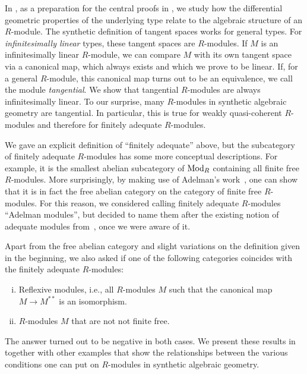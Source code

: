 In , as a preparation for the central proofs in , we study how the differential geometric properties of the underlying type relate to the algebraic structure of an $R$-module.
The synthetic definition of tangent spaces works for general types. For \emph{infinitesimally linear} types, these tangent spaces are $R$-modules. If $M$ is an infinitesimally linear $R$-module, we can compare $M$ with its own tangent space via a canonical map, which always exists and which we prove to be linear. If, for a general $R$-module, this canonical map turns out to be an equivalence, we call the module \emph{tangential}. We show that tangential $R$-modules are always infinitesimally linear.
To our surprise, many $R$-modules in synthetic algebraic geometry are tangential.  In particular, this is true for weakly quasi-coherent $R$-modules and therefore for finitely adequate $R$-modules.

We gave an explicit definition of ``finitely adequate'' above, but the subcategory of finitely adequate $R$-modules has some more conceptual descriptions.
For example, it is the smallest abelian subcategory of $\textup{Mod}_{R}$ containing all finite free $R$-modules.
More surprisingly, by making use of Adelman's work~\cite{adelman-construction}, one can show that it is in fact the free abelian category on the category of finite free $R$-modules.
For this reason, we considered calling finitely adequate $R$-modules ``Adelman modules'', but decided to name them after the existing notion of adequate modules
from~\cite[\href{https://stacks.math.columbia.edu/tag/06Z1}{Tag 06Z1}]{stacks-project},
once we were aware of it.

Apart from the free abelian category and slight variations on the definition given in the beginning, we also asked if one of the following categories coincides with the finitely adequate $R$-modules:

\begin{enumerate}[(i)]
\item Reflexive modules, i.e., all $R$-modules $M$ such that the canonical map $M \to M^{\ast\ast}$ is an isomorphism.
\item $R$-modules $M$ that are not not finite free.
\end{enumerate}
%
The answer turned out to be negative in both cases. We present these results in  together with other examples that show the relationships between the various conditions one can put on $R$-modules in synthetic algebraic geometry.
